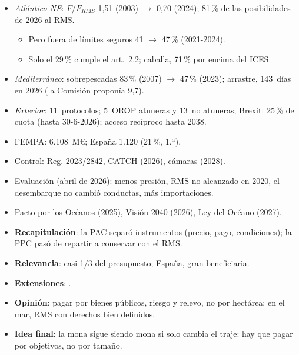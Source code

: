 \documentclass{article}
\begin{document}
\begin{columnas}
\begin{itemize}
\item \emph{Atlántico NE}: $F/F_{\mathit{RMS}}$ 1,51 (2003) $\to$ 0,70 (2024); 81\,\% de las posibilidades de 2026 al RMS.
  \begin{itemize}
  \item Pero fuera de límites seguros 41 $\to$ 47\,\% (2021-2024).
  \item Solo el 29\,\% cumple el art.~2.2; caballa, 71\,\% por encima del ICES.
  \end{itemize}
\item \emph{Mediterráneo}: sobrepescadas 83\,\% (2007) $\to$ 47\,\% (2023); arrastre, 143~días en 2026 (la Comisión proponía 9,7).
\end{itemize}
\begin{itemize}
\item \emph{Exterior}: 11~protocolos; 5~OROP atuneras y 13~no atuneras; Brexit: 25\,\% de cuota (hasta 30-6-2026); acceso recíproco hasta 2038.
\item FEMPA: 6.108~M€; España 1.120 (21\,\%, 1.ª).
\item Control: Reg. 2023/2842, CATCH (2026), cámaras (2028).
\item Evaluación (abril de 2026): menos presión, RMS no alcanzado en 2020, el desembarque no cambió conductas, más importaciones.
\item Pacto por los Océanos (2025), Visión 2040 (2026), Ley del Océano (2027).
\end{itemize}

\begin{itemize}
\item \textbf{Recapitulación}: la PAC separó instrumentos (precio, pago, condiciones); la PPC pasó de repartir a conservar con el RMS.
\item \textbf{Relevancia}: casi 1/3 del presupuesto; España, gran beneficiaria.
\item \textbf{Extensiones}:     .
\item \textbf{Opinión}: pagar por bienes públicos, riesgo y relevo, no por hectárea; en el mar, RMS con derechos bien definidos.
\item \textbf{Idea final}: la mona sigue siendo mona si solo cambia el traje: hay que pagar por objetivos, no por tamaño.
\end{itemize}


\end{columnas}
\end{document}
